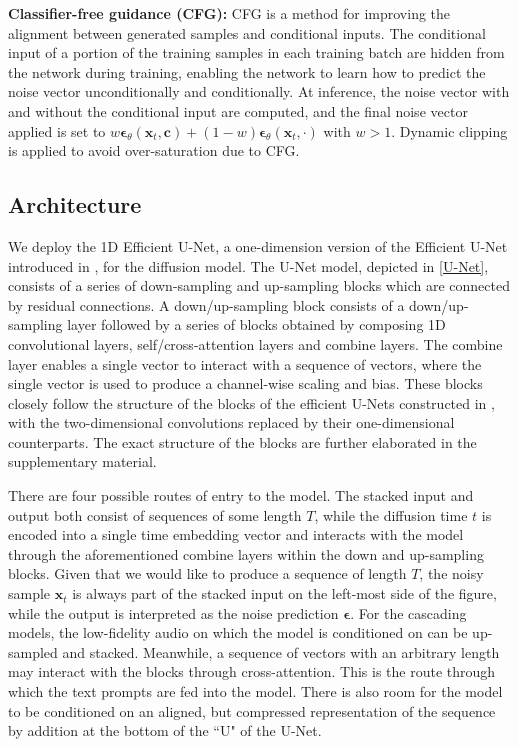 \textbf{Classifier-free guidance (CFG):} CFG \cite{ho2022classifier} is a method for improving the alignment between generated samples and conditional inputs. The conditional input of a portion of the training samples in each training batch are hidden from the network during training, enabling the network to learn how to predict the noise vector unconditionally and conditionally. At inference, the noise vector with and without the conditional input are computed, and the final noise vector applied is set to $w \bm{\epsilon}_\theta(\mathbf{x}_t, \mathbf{c}) + (1 - w) \bm{\epsilon}_\theta(\mathbf{x}_t, \cdot) $ with $w > 1$. Dynamic clipping \cite{saharia2022photorealistic} is applied to avoid over-saturation due to CFG.

\subsection{Architecture}

We deploy the 1D Efficient U-Net, a one-dimension version of the Efficient U-Net introduced in \cite{saharia2022photorealistic}, for the diffusion model. The U-Net model, depicted in \cref{U-Net}, consists of a series of down-sampling and up-sampling blocks which are connected by residual connections. A down/up-sampling block consists of a down/up-sampling layer followed by a series of blocks obtained by composing 1D convolutional layers, self/cross-attention layers and combine layers. The combine layer enables a single vector to interact with a sequence of vectors, where the single vector is used to produce a channel-wise scaling and bias. These blocks closely follow the structure of the blocks of the efficient U-Nets constructed in \cite{saharia2022photorealistic}, with the two-dimensional convolutions replaced by their one-dimensional counterparts. The exact structure of the blocks are further elaborated in the supplementary material.

There are four possible routes of entry to the model. The stacked input and output both consist of sequences of some length $T$, while the diffusion time $t$ is encoded into a single time embedding vector and interacts with the model through the aforementioned combine layers within the down and up-sampling blocks. Given that we would like to produce a sequence of length $T$, the noisy sample $\mathbf{x}_t$ is always part of the stacked input on the left-most side of the figure, while the output is interpreted as the noise prediction $\bm\epsilon$. For the cascading models, the low-fidelity audio on which the model is conditioned on can be up-sampled and stacked. Meanwhile, a sequence of vectors with an arbitrary length may interact with the blocks through cross-attention. This is the route through which the text prompts are fed into the model. There is also room for the model to be conditioned on an aligned, but compressed representation of the sequence by addition at the bottom of the ``U" of the U-Net.


